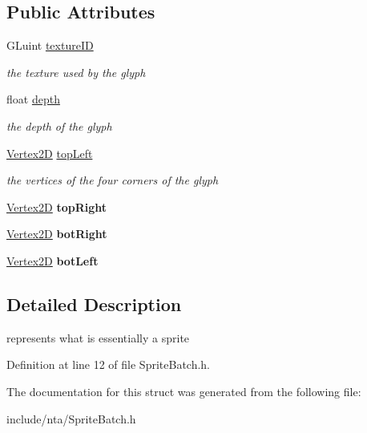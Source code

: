 \subsection*{Public Attributes}
\begin{DoxyCompactItemize}
\item 
\mbox{\label{structnta_1_1Glyph_acd8af1fcb19c4fb960808defbee5abe5}} 
G\+Luint \hyperlink{structnta_1_1Glyph_acd8af1fcb19c4fb960808defbee5abe5}{texture\+ID}
\begin{DoxyCompactList}\small\item\em the texture used by the glyph \end{DoxyCompactList}\item 
\mbox{\label{structnta_1_1Glyph_a259a2061c71dfd9fa0857f52d4daff8a}} 
float \hyperlink{structnta_1_1Glyph_a259a2061c71dfd9fa0857f52d4daff8a}{depth}
\begin{DoxyCompactList}\small\item\em the depth of the glyph \end{DoxyCompactList}\item 
\mbox{\label{structnta_1_1Glyph_a71969ecd8d228e48f9dff95787187282}} 
\hyperlink{structnta_1_1Vertex2D}{Vertex2D} \hyperlink{structnta_1_1Glyph_a71969ecd8d228e48f9dff95787187282}{top\+Left}
\begin{DoxyCompactList}\small\item\em the vertices of the four corners of the glyph \end{DoxyCompactList}\item 
\mbox{\label{structnta_1_1Glyph_a50ce474e9d7b6088e88d991d16f4b047}} 
\hyperlink{structnta_1_1Vertex2D}{Vertex2D} {\bfseries top\+Right}
\item 
\mbox{\label{structnta_1_1Glyph_a5d911b010ab2b67cd4c9e642faf3cbf2}} 
\hyperlink{structnta_1_1Vertex2D}{Vertex2D} {\bfseries bot\+Right}
\item 
\mbox{\label{structnta_1_1Glyph_aba92c1f9cb4d5e17270d90a4f5d19b0b}} 
\hyperlink{structnta_1_1Vertex2D}{Vertex2D} {\bfseries bot\+Left}
\end{DoxyCompactItemize}


\subsection{Detailed Description}
represents what is essentially a sprite 

Definition at line 12 of file Sprite\+Batch.\+h.



The documentation for this struct was generated from the following file\+:\begin{DoxyCompactItemize}
\item 
include/nta/Sprite\+Batch.\+h\end{DoxyCompactItemize}
